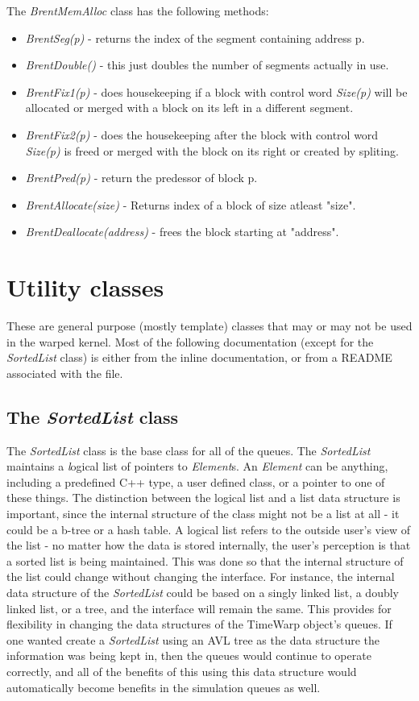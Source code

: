 \documentclass[11pt]{report}
\begin{document}
The {\it BrentMemAlloc} class has the following methods:

\begin{itemize}
\item 
{\it BrentSeg(p)} - returns the index of the segment containing address p.
\item
{\it BrentDouble()} - this just doubles the number of segments actually
in use.
\item 
{\it BrentFix1(p)} - does housekeeping if a block with control word
{\it Size(p)} will be allocated or merged with a block on its left in a
different segment.
\item
{\it BrentFix2(p)} - does the housekeeping after the block with control
word {\it Size(p)} is freed or merged with the block on its right or 
created by spliting. 
\item
{\it BrentPred(p)} - return the predessor of block p. 
\item
{\it BrentAllocate(size)} - Returns index of a block of size atleast "size".
\item
{\it BrentDeallocate(address)} - frees the block starting at "address".
\end{itemize} 

\chapter{Utility classes}

These are general purpose (mostly template) classes that may or may not
be used in the {\sc warped} kernel.  Most of the following documentation
(except for the {\it SortedList} class) is either from the inline
documentation, or from a README associated with the file. 

\section{The {\it SortedList} class}

The {\it SortedList} class is the base class for all of the queues.  The
{\it SortedList} maintains a {\emph logical} list of pointers to {\it
Element}s.  An {\it Element} can be anything, including a predefined C++
type, a user defined class, or a pointer to one of these things. The
distinction between the logical list and a list data structure is
important, since the internal structure of the class might not be a list
at all - it could be a b-tree or a hash table.  A logical list refers to
the outside user's view of the list - no matter how the data is stored
internally, the user's perception is that a sorted list is being
maintained.  This was done so that the internal structure of the list
could change without changing the interface.  For instance, the internal
data structure of the {\it SortedList} could be based on a singly linked
list, a doubly linked list, or a tree, and the interface will remain the
same.  This provides for flexibility in changing the data structures of
the TimeWarp object's queues.  If one wanted create a {\it SortedList}
using an AVL tree as the data structure the information was being kept in,
then the queues would continue to operate correctly, and all of the
benefits of this using this data structure would automatically become
benefits in the simulation queues as well.
\end{document}
